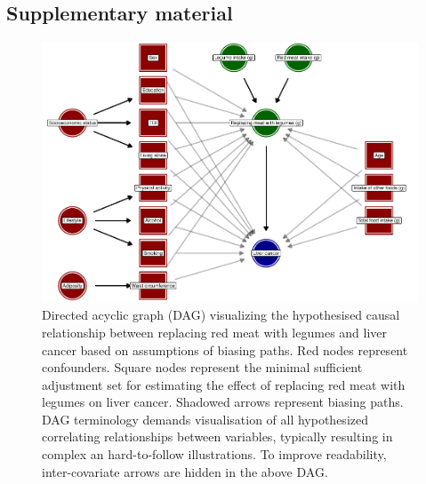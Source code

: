 \documentclass[sn-basic,Numbered,iicol,pdflatex]{sn-jnl}
\begin{document}
\begin{appendices}

\renewcommand{\thetable}{S\arabic{table}} \renewcommand{\theHtable}{S\arabic{table}}
\renewcommand{\thefigure}{S\arabic{figure}} \renewcommand{\theHfigure}{S\arabic{figure}}

\hypertarget{secA1}{%
\section{Supplementary material}\label{secA1}}

\begin{figure}[!t]
\includegraphics[width=1\linewidth,]{legliv_eur-j-nutr_files/figure-latex/fig2-1} \caption{Directed acyclic graph (DAG) visualizing the hypothesised causal relationship between replacing red meat with legumes and liver cancer based on assumptions of biasing paths. Red nodes represent confounders. Square nodes represent the minimal sufficient adjustment set for estimating the effect of replacing red meat with legumes on liver cancer. Shadowed arrows represent biasing paths. DAG terminology demands visualisation of all hypothesized correlating relationships between variables, typically resulting in complex an hard-to-follow illustrations. To improve readability, inter-covariate arrows are hidden in the above DAG.}\label{fig:fig2}
\end{figure}


\end{appendices}
\end{document}
